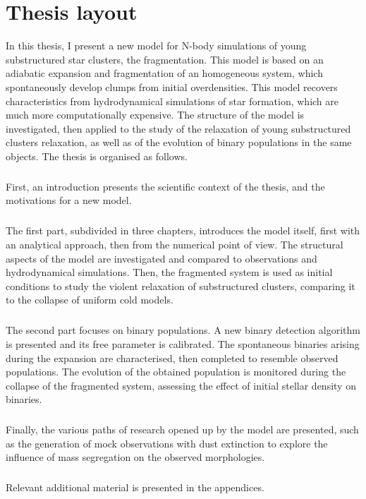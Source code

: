 

\chapter*{Thesis layout}

In this thesis, I present a new model for N-body simulations of young substructured star clusters, the \HubLem fragmentation. This model is based on an adiabatic expansion and fragmentation of an homogeneous system, which spontaneously develop clumps from initial overdensities. This model recovers characteristics from hydrodynamical simulations of star formation, which are much more computationally expensive. The structure of the \HubLem model is investigated, then applied to the study of the relaxation of young substructured clusters relaxation, as well as of the evolution of binary populations in the same objects. The thesis is organised as follows.

\paragraph*{}
First, an introduction presents the scientific context of the thesis, and the motivations for a new model. 

\paragraph*{}
The first part, subdivided in three chapters, introduces the \HubLem model itself, first with an analytical approach, then from the numerical point of view. The structural aspects of the model are investigated and compared to observations and hydrodynamical simulations. Then, the fragmented system is used as initial conditions to study the violent relaxation of substructured clusters, comparing it to the collapse of uniform cold models.

\paragraph*{}
The second part focuses on binary populations. A new binary detection algorithm is presented and its free parameter is calibrated. The spontaneous binaries arising during the \HubLem expansion are characterised, then completed to resemble observed populations. The evolution of the obtained population is monitored during the collapse of the fragmented system, assessing the effect of initial stellar density on binaries.

\paragraph*{}
Finally,  the various paths of research opened up by the \HubLem model are presented, such as the generation of mock observations with dust extinction to explore the influence of mass segregation on the observed morphologies.%

\paragraph*{}
Relevant additional material is presented in the appendices. 